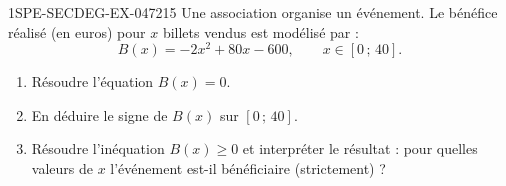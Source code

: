 \begin{exercice}{1SPE-SECDEG-EX-047}{2}{15}
Une association organise un événement. Le bénéfice réalisé (en euros) pour $x$ billets vendus est modélisé par :
\[
B(x) = -2x^2 + 80x - 600, \qquad x \in [0\,;\,40].
\]

\begin{enumerate}
  \item Résoudre l'équation $B(x) = 0$.
  \item En déduire le signe de $B(x)$ sur $[0\,;\,40]$.
  \item Résoudre l'inéquation $B(x) \geqslant 0$ et interpréter le résultat : pour quelles valeurs de $x$ l'événement est-il bénéficiaire (strictement) ?
\end{enumerate}
\end{exercice}
